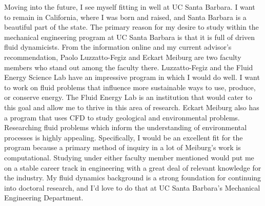 \documentclass{article}
\begin{document}
Moving into the future, I see myself fitting in well at UC Santa Barbara. I want to remain in California, where I was born and raised, and Santa Barbara is a beautiful part of the state. The primary reason for my desire to study within the mechanical engineering program at UC Santa Barbara is that it is full of driven fluid dynamicists. From the information online and my current advisor's recommendation, Paolo Luzzatto-Fegiz and Eckart Meiburg are two faculty members who stand out among the faculty there. Luzzatto-Fegiz and the Fluid Energy Science Lab have an impressive program in which I would do well. I want to work on fluid problems that influence more sustainable ways to use, produce, or conserve energy. The Fluid Energy Lab is an institution that would cater to this goal and allow me to thrive in this area of research. Eckart Meiburg also has a program that uses CFD to study geological and environmental problems. Researching fluid problems which inform the understanding of environmental processes is highly appealing. Specifically, I would be an excellent fit for the program because a primary method of inquiry in a lot of Meiburg's work is computational. Studying under either faculty member mentioned would put me on a stable career track in engineering with a great deal of relevant knowledge for the industry. My fluid dynamics background is a strong foundation for continuing into doctoral research, and I'd love to do that at UC Santa Barbara's Mechanical Engineering Department.
\end{document}
